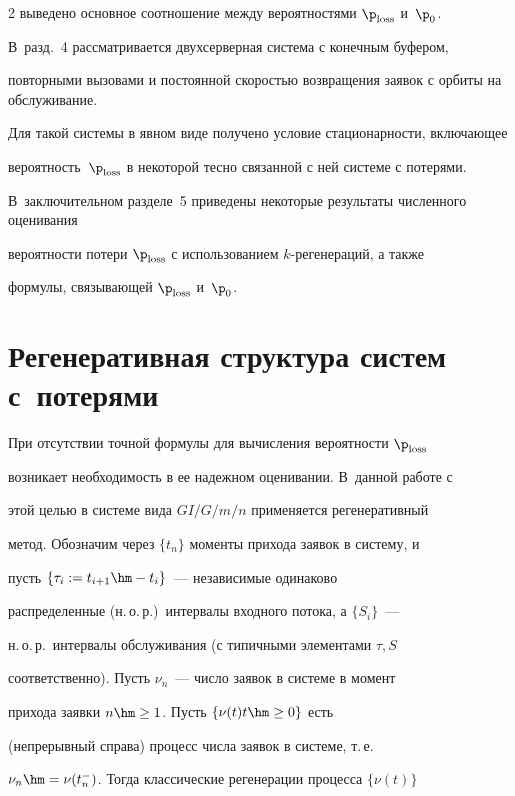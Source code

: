 \begin{multicols}{2}
 выведено основное соотношение между  вероятностями   $\p_{\mathrm{loss}}$ и~$\p_0$.


 В~разд.~4 рассматривается двухсерверная система с конечным буфером,


 повторными вызовами и постоянной скоростью возвращения заявок с орбиты на обслуживание.


Для такой системы в явном виде получено условие стационарности, включающее


вероятность~$\p_{\mathrm{loss}}$ в некоторой тесно связанной с ней системе с потерями. 


В~заключительном разделе~5 приведены некоторые результаты численного оценивания


ве\-ро\-ят\-ности потери $\p_{\mathrm{loss}}$ с использованием $k$-ре\-ге\-не\-ра\-ций, а также


формулы, связывающей $\p_{\mathrm{loss}}$ и~$\p_0$.





\section{Регенеративная структура систем с~потерями}





При отсутствии точной формулы для вычисления вероятности $\p_{\mathrm{loss}}$


возникает необходимость в ее надежном  оценивании. В~данной работе с


этой целью  в сис\-те\-ме вида $GI/G/m/n$ применяется регенеративный


метод. Обозначим через $\{t_n\}$ моменты прихода заявок в сис\-те\-му, и


пусть $\{\tau_i:=t_{i+1}\hm-t_i\}$~--- независимые одинаково


распределенные (н.\,о.\,р.)\ интервалы входного потока, а $\{S_i\}$~---


н.\,о.\,р.\ интервалы обслуживания (с типичными элементами $\tau,S$


соответственно). Пусть $\nu_n$~--- число заявок в сис\-те\-ме в момент


прихода заявки $n\hm\ge 1$. Пусть $\{\nu(t)t\hm\ge 0\}$ есть


(непрерывный справа) процесс числа заявок в сис\-те\-ме, т.\,е.\


$\nu_n\hm=\nu(t_n^-)$. Тогда классические регенерации процесса $\{\nu(t)\}$ 



\end{multicols}
